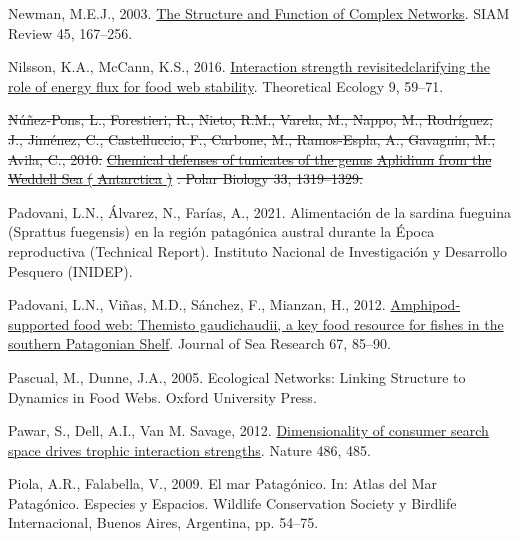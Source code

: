 \documentclass[
]{article}
\newlength{\cslhangindent}
\newenvironment{CSLReferences}[2] %
 {\begin{list}{}{%
  \setlength{\itemindent}{0pt}
  \setlength{\leftmargin}{0pt}
  \setlength{\parsep}{0pt}
  \ifodd #1
   \setlength{\leftmargin}{\cslhangindent}
   \setlength{\itemindent}{-1\cslhangindent}
  \fi
  \setlength{\itemsep}{#2\baselineskip}}}
 {\end{list}}
\providecommand{\DIFdel}[1]{{\protect\color{red}\sout{#1}}}                      %
\providecommand{\DIFdelbegin}{} %
\providecommand{\DIFdelend}{} %
\newcommand{\DIFscaledelfig}{0.5}
\newlength{\DIFdelgraphicswidth} %
\newlength{\DIFdelgraphicsheight} %
\newcommand{\DIFdelincludegraphics}[2][]{%
\sbox{\DIFdelgraphicsbox}{\DIFOincludegraphics[#1]{#2}}%
\settoboxwidth{\DIFdelgraphicswidth}{\DIFdelgraphicsbox} %
\settoboxtotalheight{\DIFdelgraphicsheight}{\DIFdelgraphicsbox} %
\scalebox{\DIFscaledelfig}{%
\parbox[b]{\DIFdelgraphicswidth}{\usebox{\DIFdelgraphicsbox}\\[-\baselineskip] \rule{\DIFdelgraphicswidth}{0em}}\llap{\resizebox{\DIFdelgraphicswidth}{\DIFdelgraphicsheight}{%
\setlength{\unitlength}{\DIFdelgraphicswidth}%
\begin{picture}(1,1)%
\thicklines\linethickness{2pt} %
{\color[rgb]{1,0,0}\put(0,0){\framebox(1,1){}}}%
{\color[rgb]{1,0,0}\put(0,0){\line( 1,1){1}}}%
{\color[rgb]{1,0,0}\put(0,1){\line(1,-1){1}}}%
\end{picture}%
}\hspace*{3pt}}} %
} %
\DeclareRobustCommand{\DIFdelbegin}{\DIFOdelbegin \let\includegraphics\DIFdelincludegraphics} %
\DeclareRobustCommand{\DIFdelend}{\DIFOaddend \let\includegraphics\DIFOincludegraphics} %
\begin{document}
\begin{CSLReferences}{1}{0}
Newman, M.E.J., 2003.
\href{https://doi.org/10.1137/S003614450342480}{The {Structure} and
{Function} of {Complex Networks}}. SIAM Review 45, 167--256.

Nilsson, K.A., McCann, K.S., 2016.
\href{https://doi.org/10.1007/s12080-015-0282-8}{Interaction strength
revisited{\textemdash}clarifying the role of energy flux for food web
stability}. Theoretical Ecology 9, 59--71.

\DIFdelbegin {}
\DIFdel{Núñez-Pons, L., Forestieri, R., Nieto, R.M., Varela, M., Nappo, M.,
Rodríguez, J., Jiménez, C., Castelluccio, F., Carbone, M., Ramos-Espla,
A., Gavagnin, M., Avila, C., 2010.
}\href{https://doi.org/10.1007/s00300-010-0819-7}{\DIFdel{Chemical defenses of
tunicates of the genus }%
\DIFdel{Aplidium}%
\DIFdel{from the }%
\DIFdel{Weddell Sea}%
\DIFdel{(}%
\DIFdel{Antarctica}%
\DIFdel{)}}%
\DIFdel{. Polar Biology 33, 1319--1329.
}%

\DIFdelend {}
Padovani, L.N., Álvarez, N., Farías, A., 2021. Alimentaci{ó}n de la
sardina fueguina ({Sprattus} fuegensis) en la regi{ó}n patag{ó}nica
austral durante la {É}poca reproductiva (Technical Report). {Instituto
Nacional de Investigaci{ó}n y Desarrollo Pesquero (INIDEP)}.

Padovani, L.N., Viñas, M.D., Sánchez, F., Mianzan, H., 2012.
\href{https://doi.org/10.1016/j.seares.2011.10.007}{Amphipod-supported
food web: {Themisto} gaudichaudii, a key food resource for fishes in the
southern {Patagonian Shelf}}. Journal of Sea Research 67, 85--90.

Pascual, M., Dunne, J.A., 2005. Ecological {Networks}: {Linking
Structure} to {Dynamics} in {Food Webs}. {Oxford University Press}.

Pawar, S., Dell, A.I., Van M. Savage, 2012.
\href{https://doi.org/10.1038/nature11131}{Dimensionality of consumer
search space drives trophic interaction strengths}. Nature 486, 485.

Piola, A.R., Falabella, V., 2009. {El mar Patag{ó}nico}. In: {Atlas del
Mar Patag{ó}nico. Especies y Espacios}. {Wildlife Conservation Society y
Birdlife Internacional}, {Buenos Aires, Argentina}, pp. 54--75.


\end{CSLReferences}
\end{document}
